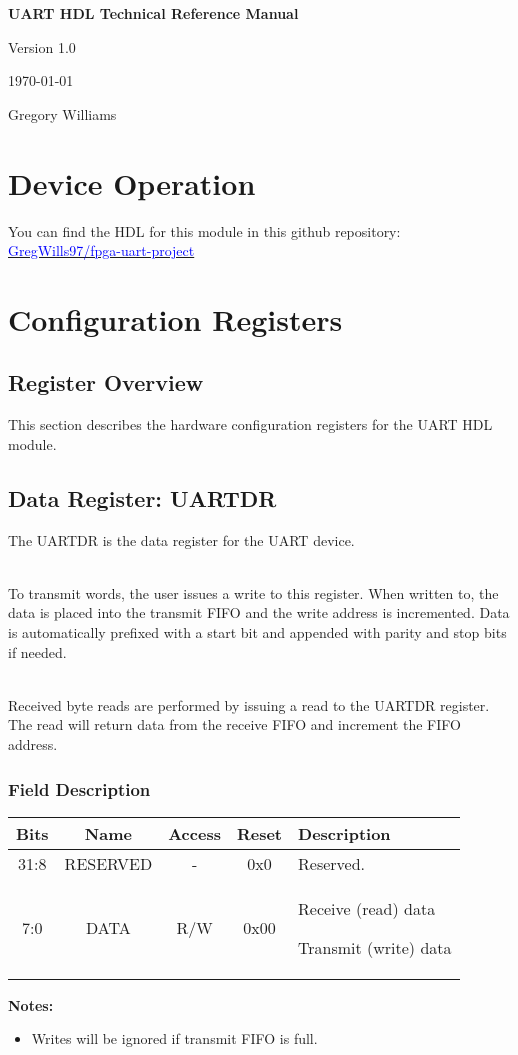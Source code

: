 \documentclass[a4paper,12pt]{article}
\begin{document}
\begin{titlepage}
    \centering
    \vspace*{2cm}
    {\Huge \bfseries UART HDL Technical Reference Manual \par}
    \vspace{2cm}
    {\Large Version 1.0 \par}
    \vspace{1cm}
    {\large \today \par}
    \vfill
    {\large Gregory Williams}
\end{titlepage}

\tableofcontents
\newpage

\section{Device Operation}
You can find the HDL for this module in this github repository:
\href{https://github.com/GregWills97/fpga-uart-project}
{\textcolor{blue}{GregWills97/fpga-uart-project}} \faGithub

\section{Configuration Registers}
\subsection{Register Overview}
This section describes the hardware configuration registers for the UART HDL module.

\subsection{Data Register: UARTDR}
The UARTDR is the data register for the UART device.

\noindent
\\To transmit words, the user issues a write to this register. When written to, the data is placed
into the transmit FIFO and the write address is incremented. Data is automatically prefixed with a
start bit and appended with parity and stop bits if needed.

\noindent
\\Received byte reads are performed by issuing a read to the UARTDR register. The read will return data
from the receive FIFO and increment the FIFO address.

\subsubsection*{Field Description}
\begin{longtable}{|c|c|c|c|m{7cm}|}
\hline
\textbf{Bits} & \textbf{Name} & \textbf{Access} & \textbf{Reset} & \textbf{Description} \\
\hline
31:8 & RESERVED & - & 0x0 & Reserved. \\
\hline
7:0 & DATA & R/W & 0x00 & Receive (read) data\par Transmit (write) data \\
\hline
\end{longtable}

\vspace{1em}
\noindent\textbf{Notes:}
\begin{itemize}
    \item Writes will be ignored if transmit FIFO is full.
\end{itemize}
\end{document}
